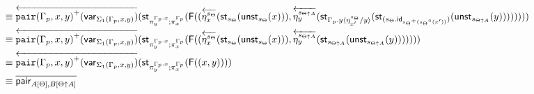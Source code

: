 \documentclass[10pt]{article}
\theoremstyle{definition}
\newcommand{\rewrite}[2]{\overleftarrow{#1}(#2)}
\newcommand\StI[2]{\ensuremath{\mathsf{st}_{#1}(#2)}}
\newcommand\UnSt[2]{\ensuremath{\mathsf{unst}_{#1}(#2)}}
\newcommand\FI[1]{\ensuremath{\mathsf{F}{(#1)}}}
\newcommand\TrPlus[2]{\ensuremath{{#1}^+(#2)}}
\newcommand\TrCirc[2]{\ensuremath{{#1}^\circ(#2)}}
\newcommand\var[1]{\ensuremath{\mathsf{var}_{#1}}}
\newcommand{\id}{\mathsf{id}}
\newcommand\ap[2]{\ensuremath{#1 \langle #2 \rangle }}
\newcommand\bdot[0]{\mathbin{.}}
\begin{document}
\begin{enumerate}[style = multiline, labelwidth = 80pt]
\begin{align*}
&\equiv \rewrite{\TrPlus{\mathtt{pair}(\asdep{\Gamma},x,y)}{\var{\Sigma_1(\asdep{\Gamma},x,y)}}}{\StI{\pi^{\asdep{\Gamma}.x}_y;\pi^{\asdep{\Gamma}}_x}{\FI{(\rewrite{\eta^{s_\Theta}_x}{\StI{s_\Theta}{\UnSt{s_\Theta}{x}}}, \rewrite{\eta^{s_{\Theta \uparrow A}}_y}{\StI{\ap{\asdep{\Gamma}.y}{\eta^{s_\Theta}_{x'}/y}}{\StI{(s_\Theta \bdot \id_{\TrPlus{s_\Theta}{\TrCirc{s_\Theta}{x'}}})}{\UnSt{s_{\Theta \uparrow A}}{y}}}})}}} \\
&\equiv \rewrite{\TrPlus{\mathtt{pair}(\asdep{\Gamma},x,y)}{\var{\Sigma_1(\asdep{\Gamma},x,y)}}}{\StI{\pi^{\asdep{\Gamma}.x}_y;\pi^{\asdep{\Gamma}}_x}{\FI{(\rewrite{\eta^{s_\Theta}_x}{\StI{s_\Theta}{\UnSt{s_\Theta}{x}}}, \rewrite{\eta^{s_{\Theta \uparrow A}}_y}{\StI{s_{\Theta \uparrow A}}{\UnSt{s_{\Theta \uparrow A}}{y}}})}}} \\
&\equiv \rewrite{\TrPlus{\mathtt{pair}(\asdep{\Gamma},x,y)}{\var{\Sigma_1(\asdep{\Gamma},x,y)}}}{\StI{\pi^{\asdep{\Gamma}.x}_y;\pi^{\asdep{\Gamma}}_x}{\FI{(x, y)}}} \\
&\equiv \upstairs{\mathsf{pair}_{A[\Theta], B[\Theta \uparrow A]}}
\end{align*}


\end{enumerate}
\end{document}
